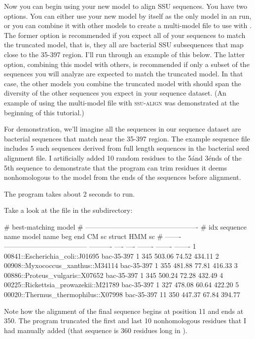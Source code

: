 Now you can begin using your new model  to align
SSU sequences. You have two options.  You can either use your new
model by itself as the only model in an  run, or you
can combine it with other models to create a multi-model file to use
with . The former option is recommended if you expect
all of your sequences to match the truncated model, that is, they all
are bacterial SSU subsequences that map close to the 35-397
region. I'll run through an example of this below. The latter option,
combining this model with others, is recommended if only a subset of
the sequences you will analyze are expected to match the truncated
model. In that case, the other models you combine the truncated model
with should span the diversity of the other sequences you expect in
your sequence dataset. (An example of using the multi-model file
 with \textsc{ssu-align} was
demonstrated at the beginning of this tutorial.)

For demonstration, we'll imagine all the sequences in our sequence
dataset are bacterial sequences that match near the 35-397 region. The
example sequence file  includes 5 such sequences
derived from full length sequences in the bacterial seed alignment
 file. I artificially added 10
random residues to the 5\' and 3\' ends of the 5th sequence to
demonstrate that the program can trim residues it deems nonhomologous
to the model from the ends of the sequences before alignment.


The program takes about 2 seconds to run. 

Take a look at the  file in the 
subdirectory:

\begin{sreoutputtiny}
#                                                               best-matching model               
#                                                -------------------------------------------------
#     idx  sequence name                         model name   beg   end    CM sc   struct   HMM sc
# -------  ------------------------------------  ----------  ----  ----  -------  -------  -------
        1  00841::Escherichia_coli::J01695       bac-35-397     1   345   503.06    74.52   434.11
        2  00908::Myxococcus_xanthus::M34114     bac-35-397     1   355   481.88    77.81   416.33
        3  00886::Proteus_vulgaris::X07652       bac-35-397     1   345   500.24    72.28   432.49
        4  00225::Rickettsia_prowazekii::M21789  bac-35-397     1   327   478.08    60.64   422.20
        5  00020::Thermus_thermophilus::X07998   bac-35-397    11   350   447.37    67.84   394.77
\end{sreoutputtiny}

Note how the alignment of the final sequence begins at position 11 and
ends at 350. The program truncated the first and last 10 nonhomologous
residues that I had manually added (that sequence is 360 residues long
in ).

